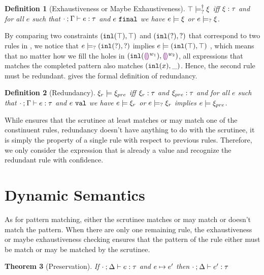 \documentclass[acmsmall,screen,review,nonacm]{acmart}
\theoremstyle{slplain}
\newtheorem{thm}{Theorem}  %
\numberwithin{thm}{section}
\newtheorem{defn}[thm]{Definition}
\begin{document}
\begin{defn}[Exhaustiveness or Maybe Exhaustiveness]
  \label{defn:exhaustiveness}
  $\top \models_{?}^{\dag} \xi$ iff $\xi : \tau$ and for all $e$ such that $\cdot \mathbin{;} \Gamma \vdash e : \tau$ and $e ~\mathtt{final}$ we have $e \models \xi$ or $e \models_{?} \xi$.
\end{defn}

By comparing two constraints $(\mathtt{inl}(\top) , \top)$ and $(\mathtt{inl}(\mathtt{?}) , \mathtt{?})$ that correspond to two rules in , we notice that
$e \models_{?} (\mathtt{inl}(\mathtt{?}) , \mathtt{?})$ implies $e \models (\mathtt{inl}(\top) , \top)$
, which means that no matter how we fill the holes in $(\mathtt{inl}(\textcolor{violet}{\llparenthesis}\textcolor{violet}{\rrparenthesis}^{w_1}) , \textcolor{violet}{\llparenthesis}\textcolor{violet}{\rrparenthesis}^{w_2})$, all expressions that matches the completed pattern also matches $(\mathtt{inl}(x) , \_)$. Hence, the second rule must be redundant.
 gives the formal definition of redundancy.

\begin{defn}[Redundancy]
  \label{defn:redundancy}
  $\xi_r \models \xi_{pre}$ iff $\xi_r : \tau$ and $\xi_{pre} : \tau$ and for all $e$ such that $\cdot \mathbin{;} \Gamma \vdash e : \tau$ and $e ~\mathtt{val}$ we have $e \models \xi_r$ or $e \models_{?} \xi_r$ implies $e \models \xi_{pre}$.
\end{defn}

While  ensures that the scrutinee at least matches or may match one of the constinuent rules, redundancy doesn't have anything to do with the scrutinee, it is simply the property of a single rule with respect to previous rules. Therefore, we only consider the expression that is already a value and recognize the redundant rule with confidence.

\section{Dynamic Semantics}
\label{sec:dynamics}

As for pattern matching, either the scrutinee matches or may match or doesn't match the pattern.
When there are only one remaining rule, the exhaustiveness or maybe exhaustiveness checking ensures that the pattern of the rule either must be match or may be matched by the scrutinee.

\begin{thm}[Preservation]
  \label{thrm:preservation}
  If $\cdot \mathbin{;} \Delta \vdash e : \tau$ and $e \mapsto e'$
  then $\cdot \mathbin{;} \Delta \vdash e' : \tau$
\end{thm}
\end{document}
